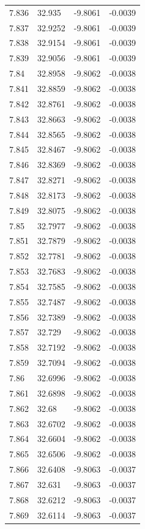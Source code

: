 \begin{tabular}{llll}
7.836 & 32.935 & -9.8061 & -0.0039 \\
7.837 & 32.9252 & -9.8061 & -0.0039 \\
7.838 & 32.9154 & -9.8061 & -0.0039 \\
7.839 & 32.9056 & -9.8061 & -0.0039 \\
7.84 & 32.8958 & -9.8062 & -0.0038 \\
7.841 & 32.8859 & -9.8062 & -0.0038 \\
7.842 & 32.8761 & -9.8062 & -0.0038 \\
7.843 & 32.8663 & -9.8062 & -0.0038 \\
7.844 & 32.8565 & -9.8062 & -0.0038 \\
7.845 & 32.8467 & -9.8062 & -0.0038 \\
7.846 & 32.8369 & -9.8062 & -0.0038 \\
7.847 & 32.8271 & -9.8062 & -0.0038 \\
7.848 & 32.8173 & -9.8062 & -0.0038 \\
7.849 & 32.8075 & -9.8062 & -0.0038 \\
7.85 & 32.7977 & -9.8062 & -0.0038 \\
7.851 & 32.7879 & -9.8062 & -0.0038 \\
7.852 & 32.7781 & -9.8062 & -0.0038 \\
7.853 & 32.7683 & -9.8062 & -0.0038 \\
7.854 & 32.7585 & -9.8062 & -0.0038 \\
7.855 & 32.7487 & -9.8062 & -0.0038 \\
7.856 & 32.7389 & -9.8062 & -0.0038 \\
7.857 & 32.729 & -9.8062 & -0.0038 \\
7.858 & 32.7192 & -9.8062 & -0.0038 \\
7.859 & 32.7094 & -9.8062 & -0.0038 \\
7.86 & 32.6996 & -9.8062 & -0.0038 \\
7.861 & 32.6898 & -9.8062 & -0.0038 \\
7.862 & 32.68 & -9.8062 & -0.0038 \\
7.863 & 32.6702 & -9.8062 & -0.0038 \\
7.864 & 32.6604 & -9.8062 & -0.0038 \\
7.865 & 32.6506 & -9.8062 & -0.0038 \\
7.866 & 32.6408 & -9.8063 & -0.0037 \\
7.867 & 32.631 & -9.8063 & -0.0037 \\
7.868 & 32.6212 & -9.8063 & -0.0037 \\
7.869 & 32.6114 & -9.8063 & -0.0037 \\

\end{tabular}
